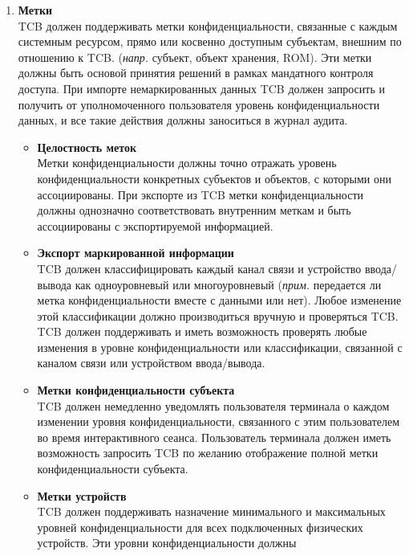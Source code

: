 \begin{enumerate}
\begin{enumerate}
\begin{enumerate}
\begin{enumerate}
                другому субъекту, получившему доступ к объекту хранения, ранее возвращенный системе.
                \item{\textbf{Метки}}\\
                TCB должен поддерживать метки конфиденциальности, связанные с каждым системным ресурсом, прямо или косвенно доступным субъектам, внешним по отношению к TCB. (\textit{напр.} субъект,
                объект хранения, ROM). Эти метки должны быть основой принятия решений в рамках мандатного контроля доступа. При импорте немаркированных данных TCB должен запросить и получить от
                уполномоченного пользователя уровень конфиденциальности данных, и все такие действия должны заноситься в журнал аудита.
                \begin{itemize}
                    \item{\textbf{Целостность меток}}\\
                    Метки конфиденциальности должны точно отражать уровень конфиденциальности конкретных субъектов и объектов, с которыми они ассоциированы. При экспорте из TCB метки конфиденциальности
                    должны однозначно соответствовать внутренним меткам и быть ассоциированы с экспортируемой информацией.
                    \item{\textbf{Экспорт маркированной информации}}\\
                    TCB должен классифицировать каждый канал связи и устройство ввода/вывода как одноуровневый или многоуровневый (\textit{прим. } передается ли метка конфиденциальности вместе с данными
                    или нет). Любое изменение этой классификации должно производиться вручную и проверяться TCB. TCB должен поддерживать и иметь возможность проверять любые изменения в уровне
                    конфиденциальности или классификации, связанной с каналом связи или устройством ввода/вывода.
                    \item{\textbf{Метки конфиденциальности субъекта}}\\
                    TCB должен немедленно уведомлять пользователя терминала о каждом изменении уровня конфиденциальности, связанного с этим пользователем во время интерактивного сеанса. Пользователь
                    терминала должен иметь возможность запросить TCB по желанию отображение полной метки конфиденциальности субъекта.
                    \item{\textbf{Метки устройств}}\\
                    TCB должен поддерживать назначение минимального и максимальных уровней конфиденциальности для всех подключенных физических устройств. Эти уровни конфиденциальности должны

\end{itemize}
\end{enumerate}
\end{enumerate}
\end{enumerate}
\end{enumerate}
